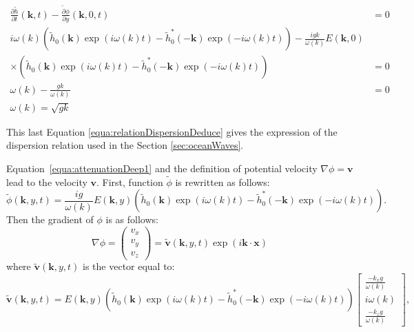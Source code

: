 \documentclass[11pt]{article}
\begin{document}
\begin{align}
	\frac{\partial \tilde{h}}{\partial t}(\mathbf{k},t) - \frac{\tilde{\partial}\phi}{\partial y}(\mathbf{k}, 0, t) & =0 \nonumber                                \\
	i\omega(k)\left(\tilde{h}_0(\mathbf{k})\exp(i\omega(k)t)-\tilde{h}_0^*(-\mathbf{k})\exp(-i\omega(k)t)\right) - \frac{igk}{\omega(k)} E(\mathbf{k},0)\nonumber \\
	\times \left(\tilde{h}_0(\mathbf{k})\exp(i\omega(k)t)-\tilde{h}_0^*(-\mathbf{k})\exp(-i\omega(k)t)\right)       & = 0 \nonumber                               \\
	\omega(k)- \frac{gk}{\omega(k)}                                                                                 & = 0 \nonumber                               \\
	\omega(k) = \sqrt{gk} \label{equa:relationDispersionDeduce}
\end{align}

This last Equation \ref{equa:relationDispersionDeduce} gives the expression of the dispersion relation used in the Section \ref{sec:oceanWaves}.

Equation~\ref{equa:attenuationDeep1} and the definition of potential velocity $\nabla\phi=\mathbf{v}$ lead to the velocity $\mathbf{v}$. First, function $\tilde{\phi}$ is rewritten as follows:
\begin{equation}
	\tilde{\phi}(\mathbf{k}, y, t)=\frac{ig}{\omega(k)} E(\mathbf{k},y) \left(\tilde{h}_0(\mathbf{k})\exp(i\omega(k)t)-\tilde{h}_0^*(-\mathbf{k})\exp(-i\omega(k)t)\right).
\end{equation}
Then the gradient of $\phi$ is as follows:
\begin{equation}
	\nabla \phi = \begin{pmatrix}
		v_x \\
		v_y \\
		v_z
	\end{pmatrix} =\tilde{\mathbf{v}}(\mathbf{k}, y, t)\exp\left(i\mathbf{k}\cdot\mathbf{x}\right)
\end{equation}
where $\tilde{\mathbf{v}}(\mathbf{k}, y, t)$ is the vector equal to:
\begin{equation}
	\tilde{\mathbf{v}}\left(\mathbf{k}, y, t\right)=%
	E\left(\mathbf{k},y\right)\left(\tilde{h}_0\left(\mathbf{k}\right)\exp\left({i\omega(k)t}\right)-\tilde{h}_0^*\left(-\mathbf{k}\right)\exp\left({-i\omega(k)t}\right)\right)
	\left[
		\begin{array}{c}
			\displaystyle\frac{-k_xg}{\omega(k)} \\
			\displaystyle i\omega(k)             \\
			\displaystyle\frac{-k_zg}{\omega(k)}
		\end{array}
		\right],
\end{equation}
\end{document}
